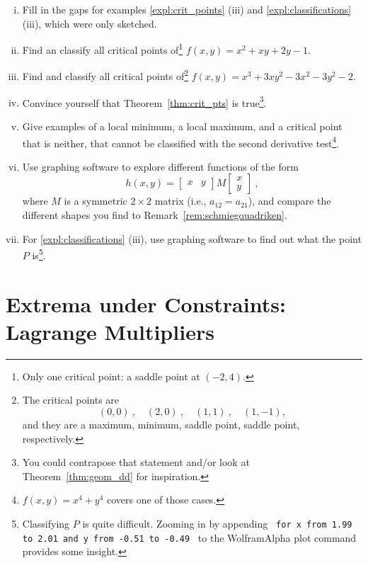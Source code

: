 \begin{exercise}
	\begin{enumerate}[(i)]
		\item Fill in the gaps for examples \ref{expl:crit_points} (iii) and \ref{expl:classifications} (iii), which were only sketched.
		\item Find an classify all critical points of\footnote{Only one critical point: a saddle point at $(-2,4)$.}
		$f(x,y) = x^2+xy+2y-1$. 
		\item Find and classify all critical points of\footnote{The critical points are
		\[ (0,0)\:,\quad(2,0)\:,\quad(1,1)\:,\quad(1,-1), \]
		and they are a maximum, minimum, saddle point, saddle point, respectively.}
		$f(x,y) = x^3+3xy^2-3x^2-3y^2-2$.
		\item Convince yourself that Theorem~\ref{thm:crit_pts} is true\footnote{You could contrapose that statement and/or look at Theorem~\ref{thm:geom_dd} for inspiration.}.
		\item Give examples of a local minimum, a local maximum, and a critical point that is neither, that cannot be classified with the second derivative test\footnote{$f(x,y)=x^4+y^4$ covers one of those cases.}.
	 	\item Use graphing software to explore different functions of the form
	 	\[ h(x,y) = \begin{bmatrix} x & y \end{bmatrix}
	 	M \begin{bmatrix} x \\ y \end{bmatrix} \:, \]
	 	where $M$ is a symmetric $2 \times 2$ matrix (i.e., $a_{12}=a_{21}$), and compare the different shapes you find to Remark~\ref{rem:schmiegquadriken}.
	 	\item For \ref{expl:classifications} (iii), use graphing software to find out what the point $P$ is\footnote{Classifying $P$ is quite difficult. Zooming in by appending \texttt{~for x from 1.99 to 2.01 and y from -0.51 to -0.49~} to the WolframAlpha plot command provides some insight.}.
	\end{enumerate}
\end{exercise}


\section{Extrema under Constraints: Lagrange Multipliers}

